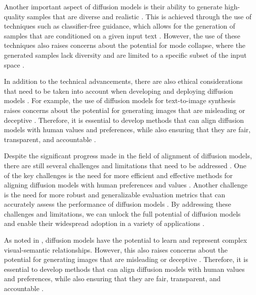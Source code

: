 \documentclass[11pt,a4paper]{article}
\begin{document}
Another important aspect of diffusion models is their ability to generate high-quality samples that are diverse and realistic \cite{doi:10.1145/3626235}. This is achieved through the use of techniques such as classifier-free guidance, which allows for the generation of samples that are conditioned on a given input text \cite{arxiv:2406.08070}. However, the use of these techniques also raises concerns about the potential for mode collapse, where the generated samples lack diversity and are limited to a specific subset of the input space \cite{doi:10.1109/tvcg.2024.3506992}.

In addition to the technical advancements, there are also ethical considerations that need to be taken into account when developing and deploying diffusion models \cite{arxiv:2402.02030}. For example, the use of diffusion models for text-to-image synthesis raises concerns about the potential for generating images that are misleading or deceptive \cite{arxiv:2404.03653}. Therefore, it is essential to develop methods that can align diffusion models with human values and preferences, while also ensuring that they are fair, transparent, and accountable \cite{arxiv:2406.05882}.

Despite the significant progress made in the field of alignment of diffusion models, there are still several challenges and limitations that need to be addressed \cite{arxiv:2502.06805}. One of the key challenges is the need for more efficient and effective methods for aligning diffusion models with human preferences and values \cite{doi:10.1109/cvpr52734.2025.02198}. Another challenge is the need for more robust and generalizable evaluation metrics that can accurately assess the performance of diffusion models \cite{arxiv:2402.16369}. By addressing these challenges and limitations, we can unlock the full potential of diffusion models and enable their widespread adoption in a variety of applications \cite{doi:10.1109/tpami.2026.3658965}. 

As noted in \cite{arxiv:2406.05191}, diffusion models have the potential to learn and represent complex visual-semantic relationships. However, this also raises concerns about the potential for generating images that are misleading or deceptive \cite{doi:10.1007/s41095-023-0371-3}. Therefore, it is essential to develop methods that can align diffusion models with human values and preferences, while also ensuring that they are fair, transparent, and accountable \cite{arxiv:2404.07946}.
\end{document}
